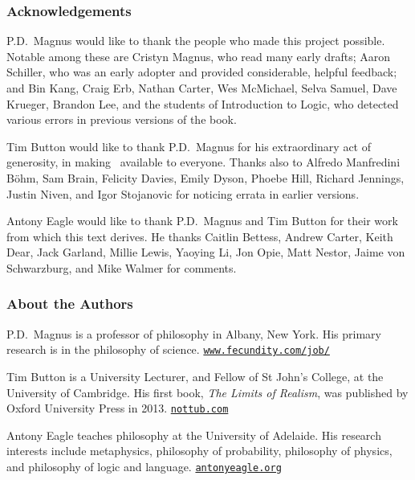 \thispagestyle{empty}
\onecolumn



\subsubsection*{Acknowledgements}
P.D.\ Magnus would like to thank the people who made this project possible. Notable among these are Cristyn Magnus, who read many early drafts; Aaron Schiller, who was an early adopter and provided considerable, helpful feedback; {and} Bin Kang, Craig Erb, Nathan Carter, Wes McMichael, Selva Samuel,  Dave Krueger, Brandon Lee, and the students of Introduction to Logic, who detected various errors in previous versions of the book. \medskip

Tim Button would like to thank P.D.\ Magnus for his extraordinary act of generosity, in making \forallx\ available to everyone. Thanks also to Alfredo Manfredini Böhm, Sam Brain, Felicity Davies, Emily Dyson, Phoebe Hill, Richard Jennings, Justin Niven,  and Igor Stojanovic for noticing errata in earlier versions. \medskip

Antony Eagle would like to thank P.D.\ Magnus and Tim Button for their work from which this text derives. He thanks Caitlin Bettess, Andrew Carter, Keith Dear, Jack Garland, Millie Lewis, Yaoying Li, Jon Opie, Matt Nestor, Jaime von Schwarzburg, and Mike Walmer for comments. %

\subsubsection*{About the Authors}


P.D.\ Magnus is a professor of philosophy in Albany, New York. His primary research is in the philosophy of science. \href{https://www.fecundity.com/job/}{\nolinkurl{www.fecundity.com/job/}}
\medskip

Tim Button is a University Lecturer, and Fellow of St John's College, at the University of Cambridge. His first book, \emph{The Limits of Realism}, was published by Oxford University Press in 2013. \href{http://nottub.com}{\nolinkurl{nottub.com}}
\medskip

Antony Eagle teaches philosophy at the University of Adelaide. His research interests include metaphysics, philosophy of probability, philosophy of physics, and philosophy of logic and language. \href{https://antonyeagle.org}{\nolinkurl{antonyeagle.org}}



